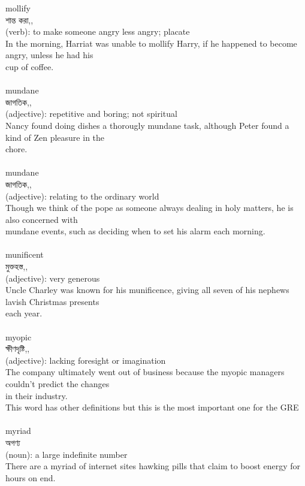 \documentclass{article}
\begin{document}
{mollify}\\
{শান্ত করা,,}\\
{(verb): to make someone angry less angry; placate\\In the morning, Harriat was unable to mollify Harry, if he happened to become angry, unless he had his\\cup of coffee.\\}\\
{mundane}\\
{জাগতিক,,}\\
{(adjective): repetitive and boring; not spiritual\\Nancy found doing dishes a thorougly mundane task, although Peter found a kind of Zen pleasure in the\\chore.\\}\\
{mundane}\\
{জাগতিক,,}\\
{(adjective): relating to the ordinary world\\Though we think of the pope as someone always dealing in holy matters, he is also concerned with\\mundane events, such as deciding when to set his alarm each morning.\\}\\
{munificent}\\
{মুক্তহস্ত,,}\\
{(adjective): very generous\\Uncle Charley was known for his munificence, giving all seven of his nephews lavish Christmas presents\\each year.\\}\\
{myopic}\\
{ক্ষীণদৃষ্টি,,}\\
{(adjective): lacking foresight or imagination\\The company ultimately went out of business because the myopic managers couldn't predict the changes\\in their industry.\\This word has other definitions but this is the most important one for the GRE\\}\\
{myriad}\\
{অগণ্য}\\
{(noun): a large indefinite number\\There are a myriad of internet sites hawking pills that claim to boost energy for hours on end.\\}\\
\end{document}
